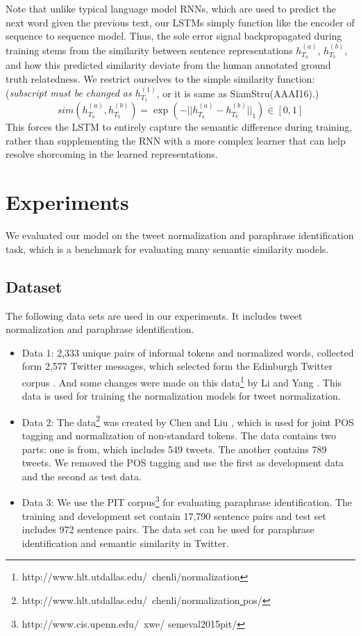 \documentclass[letterpaper]{article}
\begin{document}
Note that unlike typical language model RNNs, which are used to predict the next word given the previous text, our LSTMs simply function like the encoder of sequence to sequence model. Thus, the sole error signal backpropagated during training stems from the similarity between sentence representations \textit{$h_{T_{a}}^{(a)}$}, \textit{$h_{T_{b}}^{(b)}$}, and how this predicted similarity deviate from the human annotated ground truth relatedness. We restrict ourselves to the simple similarity function: (\textit{subscript must be changed as $h_{T_{1}}^{(1)}$}, or it is same as SiamStru(AAAI16).)
\begin{equation}\label{key}
sim(h_{T_{a}}^{(a)},h_{T_{b}}^{(b)}) = \exp(-||h_{T_{a}}^{(a)}-h_{T_{b}}^{(b)}||_{1}) \in [0,1]
\end{equation}
This forces the LSTM to entirely capture the semantic difference during training, rather than supplementing the RNN with a more complex learner that can help resolve shorcoming in the learned representations.

\section{Experiments}
We evaluated our model on the tweet normalization and paraphrase identification task, which is a benchmark for evaluating many semantic similarity models.

\subsection{Dataset}
The following data sets are used in our experiments. It includes tweet normalization and paraphrase identification.

\begin{itemize}
	\item Data 1: 2,333 unique pairs of informal tokens and normalized words, collected form 2,577 Twitter messages, which selected form the Edinburgh Twitter corpus \cite{pennell-liu:2011:IJCNLP-2011}. And some changes were made on this data\footnote{http://www.hlt.utdallas.edu/~chenli/normalization} by Li and Yang . This data is used for training the normalization models for tweet normalization.
	\item Data 2: The data\footnote{http://www.hlt.utdallas.edu/~chenli/normalization\underline{ }pos/} was created by Chen and Liu , which is used for joint POS tagging and normalization of non-standard tokens. The data contains two parts: one is from, which includes 549 tweets. The another contains 789 tweets. We removed the POS tagging and use the first as development data and the second as test data.
	\item Data 3: We use the PIT corpus\footnote{http://www.cis.upenn.edu/~xwe/
	semeval2015pit/} for evaluating paraphrase identification. The training and development set contain 17,790 sentence pairs and test set includes 972 sentence pairs\cite{xu-callisonburch-dolan:2015:SemEval}. The data set can be used for paraphrase identification and semantic similarity in Twitter.
\end{itemize}
\end{document}

